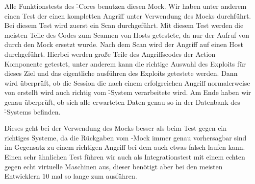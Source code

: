 Alle Funktionstests des \f-Cores benutzen diesen Mock.
Wir haben unter anderem einen Test der einen kompletten Angriff unter Verwendung des Mocks
durchführt.
Bei diesem Test wird zuerst ein Scan durchgeführt.
Mit diesem Test werden die meisten Teile des Codes zum Scannen von Hosts
getestete, da nur der Aufruf von  durch den Mock ersetzt wurde.
Nach dem Scan wird der Angriff auf einen Host durchgeführt.
Hierbei werden große Teile des Angriffscodes der Action Komponente getestet,
unter anderem kann die richtige Auswahl des Exploits für dieses Ziel und das
eigentliche ausführen des Exploits getestete werden.
Dann wird überprüft, ob die Session die nach einem erfolgreichen Angriff
normalerweise von  erstellt wird auch richtig vom \f-System
 verarbeitete wird.
Am Ende haben wir genau überprüft, ob sich alle erwarteten Daten genau
so in der Datenbank des \f-Systems befinden.

Dieses geht bei der Verwendung des Mocks besser als beim Test gegen ein 
richtiges Systeme, da die Rückgaben vom -Mock immer genau vorhersagbar
sind im Gegensatz zu einem richtigen Angriff bei dem auch etwas falsch laufen kann.
Einen sehr ähnlichen Test führen wir auch als Integrationstest mit einem
echten  gegen echt virtuelle Maschinen aus, dieser benötigt aber
bei den meisten Entwicklern 10 mal so lange zum ausführen.
